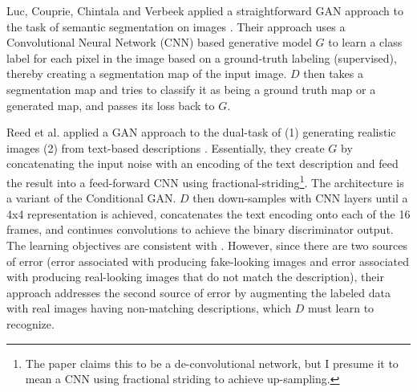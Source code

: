 \documentclass[11pt]{article}
\begin{document}

Luc, Couprie, Chintala and Verbeek applied a straightforward GAN approach to the task of semantic segmentation on images \cite{Luc2016SemanticSU}.  Their approach uses a Convolutional Neural Network (CNN) based generative model $G$ to learn a class label for each pixel in the image based on a ground-truth labeling (supervised), thereby creating a segmentation map of the input image.  $D$ then takes a segmentation map and tries to classify it as being a ground truth map or a generated map, and passes its loss back to $G$.  


Reed et al. applied a GAN approach to the dual-task of (1) generating realistic images (2) from text-based descriptions \cite{reed2016generative}.  Essentially, they create $G$ by concatenating the input noise with an encoding of the text description and feed the result into a feed-forward CNN using fractional-striding\footnote{The paper claims this to be a de-convolutional network, but I presume it to mean a CNN using fractional striding to achieve up-sampling.}.  The architecture is a variant of the Conditional GAN.  $D$ then down-samples with CNN layers until a 4x4 representation is achieved, concatenates the text encoding onto each of the 16 frames, and continues convolutions to achieve the binary discriminator output.  The learning objectives are consistent with \cite{NIPS2014_5423}.  However, since there are two sources of error (error associated with producing fake-looking images and error associated with producing real-looking images that do not match the description), their approach addresses the second source of error by augmenting the labeled data with real images having non-matching descriptions, which $D$ must learn to recognize.
\end{document}
